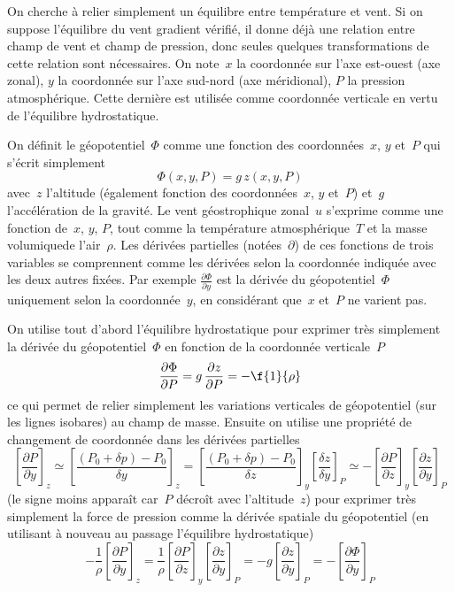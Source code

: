 \sk
On cherche à relier simplement un équilibre entre température et vent. Si on suppose l'équilibre du vent gradient vérifié, il donne déjà une relation entre champ de vent et champ de pression, donc seules quelques transformations de cette relation sont nécessaires. On note~$x$ la coordonnée sur l'axe est-ouest (axe zonal), $y$ la coordonnée sur l'axe sud-nord (axe méridional), $P$ la pression atmosphérique. Cette dernière est utilisée comme coordonnée verticale en vertu de l'équilibre hydrostatique.

\sk
On définit le géopotentiel~$\Phi$ comme une fonction des coordonnées~$x$, $y$ et~$P$ qui s'écrit simplement
\[ \Phi(x,y,P)=g \, z(x,y,P) \] 
\noindent avec~$z$ l'altitude (également fonction des coordonnées~$x$, $y$ et~$P$) et~$g$ l'accélération de la gravité. Le vent géostrophique zonal~$u$ s'exprime comme une fonction de~$x$, $y$, $P$, tout comme la température atmosphérique~$T$ et la masse volumiquede l'air~$\rho$. Les dérivées partielles (notées~$\partial$) de ces fonctions de trois variables se comprennent comme les dérivées selon la coordonnée indiquée avec les deux autres fixées. Par exemple $\frac{\partial \Phi}{\partial y}$ est la dérivée du géopotentiel~$\Phi$ uniquement selon la coordonnée~$y$, en considérant que~$x$ et~$P$ ne varient pas. 

\sk
On utilise tout d'abord l'équilibre hydrostatique pour exprimer très simplement la dérivée du géopotentiel~$\Phi$ en fonction de la coordonnée verticale~$P$
\[ \frac{\partial \Phi}{\partial P} = g \, \frac{\partial z}{\partial P} = -\f{1}{\rho} \] 
\noindent ce qui permet de relier simplement les variations verticales de géopotentiel (sur les lignes isobares) au champ de masse. Ensuite on utilise une propriété de changement de coordonnée dans les dérivées partielles
\[ 
\left[ \frac{\partial P}{\partial y} \right]_z
\simeq
\left[ \frac{(P_0 + \delta p) - P_0}{\delta y} \right]_z 
=
\left[ \frac{(P_0 + \delta p) - P_0}{\delta z} \right]_y
\left[ \frac{\delta z}{\delta y} \right]_P
\simeq
-\left[ \frac{\partial P}{\partial z} \right]_y \left[ \frac{\partial z}{\partial y} \right]_P
\]
(le signe moins apparaît car~$P$ décroît avec l'altitude~$z$) pour exprimer très simplement la force de pression comme la dérivée spatiale du géopotentiel (en utilisant à nouveau au passage l'équilibre hydrostatique)
\[ -\frac{1}{\rho} \left[ \frac{\partial P}{\partial y} \right]_z
= \frac{1}{\rho} \left[ \frac{\partial P}{\partial z} \right]_y \left[ \frac{\partial z}{\partial y} \right]_P
= -g \left[ \frac{\partial z}{\partial y} \right]_P
= -\left[ \frac{\partial \Phi}{\partial y} \right]_P
\]

